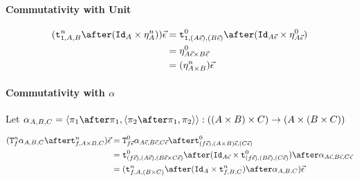 \documentclass{report}
\begin{document}
\paragraph{Commutativity with Unit}


\begin{align}
    (\tstrengthn{\1}{A}{B}\after(\Id{A}\times \pointn{A}))\ev & = \tstrengthz{\1}{(A\ev)}{(B\ev)}\after(\Id{A\ev}\times \pointz{A\ev})\\
    & = \pointz{A\ev\times B\ev}\\
    & = (\pointn{A\times B})\ev
\end{align}

\paragraph{Commutativity with $\alpha$}
Let $\alpha_{A, B, C} = \pr{\p\after\p}{\pr{\pp\after\p}{\pp}}: ((A \times B) \times C) \rightarrow (A \times (B \times C))$



\begin{align}
    (\Tn{f}{\alpha_{A, B, C}}\after\tstrengthn{f}{A\times B}{C})\ev & = \Tz{f\ev}{\alpha_{A\ev, B\ev, C\ev}} \after\tstrengthz{(f\ev)}{(A\times B)\ev}{(C\ev)}\\
    & = \tstrengthz{(f\ev)}{(A\ev)}{(B\ev\times C\ev)}\after(\Id{A\ev}\times \tstrengthz{(f\ev)}{(B\ev)}{(C\ev)})\after\alpha_{A\ev, B\ev, C\ev}\\
    & = (\tstrengthn{f}{A}{(B\times C)}\after(\Id{A}\times \tstrengthn{f}{B}{C})\after\alpha_{A, B, C})\ev\\
\end{align}
\end{document}
